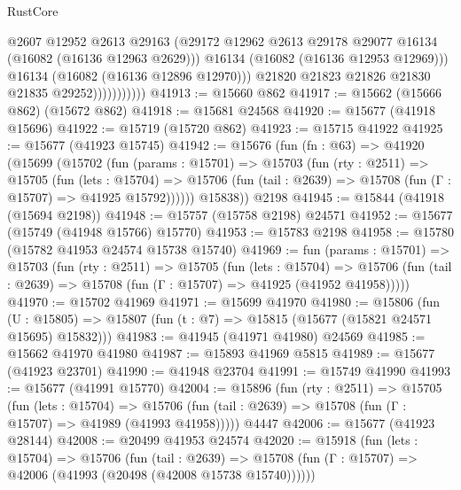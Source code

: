 \begin{lexlean}{RustCore}
\begin{coremodule}
                              @2607
                              @12952
                              @2613
                              @29163
                              (@29172
                                @12962
                                @2613
                                @29178
                                @29077
                                @16134
                                (@16082 (@16136 @12963 @2629)))
                              @16134
                              (@16082 (@16136 @12953 @12969)))
                            @16134
                            (@16082 (@16136 @12896 @12970)))
                          @21820
                          @21823
                          @21826
                          @21830
                          @21835
                          @29252)))))))))))
@41913 := @15660 @862
@41917 := @15662 (@15666 @862) (@15672 @862)
@41918 := @15681 @24568
@41920 := @15677 (@41918 @15696)
@41922 := @15719 (@15720 @862)
@41923 := @15715 @41922
@41925 := @15677 (@41923 @15745)
@41942 := @15676
    (fun (fn : @63) =>
    @41920
      (@15699
        (@15702
          (fun (params : @15701) =>
          @15703
            (fun (rty : @2511) =>
            @15705
              (fun (lets : @15704) =>
              @15706 (fun (tail : @2639) => @15708 (fun (Γ : @15707) => @41925 @15792))))))
        @15838))
    @2198
@41945 := @15844 (@41918 (@15694 @2198))
@41948 := @15757 (@15758 @2198) @24571
@41952 := @15677 (@15749 (@41948 @15766) @15770)
@41953 := @15783 @2198
@41958 := @15780 (@15782 @41953 @24574 @15738 @15740)
@41969 := fun (params : @15701) =>
  @15703
    (fun (rty : @2511) =>
    @15705
      (fun (lets : @15704) =>
      @15706 (fun (tail : @2639) => @15708 (fun (Γ : @15707) => @41925 (@41952 @41958)))))
@41970 := @15702 @41969
@41971 := @15699 @41970
@41980 := @15806
    (fun (U : @15805) => @15807 (fun (t : @7) => @15815 (@15677 (@15821 @24571 @15695) @15832)))
@41983 := @41945 (@41971 @41980) @24569
@41985 := @15662 @41970 @41980
@41987 := @15893 @41969 @5815
@41989 := @15677 (@41923 @23701)
@41990 := @41948 @23704
@41991 := @15749 @41990
@41993 := @15677 (@41991 @15770)
@42004 := @15896
    (fun (rty : @2511) =>
    @15705
      (fun (lets : @15704) =>
      @15706 (fun (tail : @2639) => @15708 (fun (Γ : @15707) => @41989 (@41993 @41958)))))
    @4447
@42006 := @15677 (@41923 @28144)
@42008 := @20499 @41953 @24574
@42020 := @15918
    (fun (lets : @15704) =>
    @15706
      (fun (tail : @2639) =>
      @15708 (fun (Γ : @15707) => @42006 (@41993 (@20498 (@42008 @15738 @15740))))))

\end{coremodule}
\end{lexlean}
